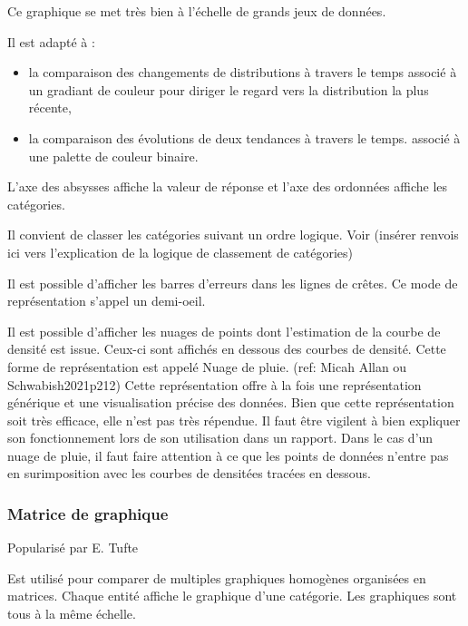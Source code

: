 \documentclass[a4paper,12pt]{article}
\begin{document}
\begin{multicols}{2}
Ce graphique se met très bien à l'échelle de grands jeux de données. \autocite{wilkeVisualizingManyDistributions2019}

Il est adapté à :
\begin{itemize}
\item la comparaison des changements de distributions à travers le temps \autocite{wilkeDirectoryVisualizations2019} associé à un gradiant de couleur pour diriger le regard vers la distribution la plus récente, \autocite{jonathanschwabishDistribution2021}
\item la comparaison des évolutions de deux tendances à travers le temps. \autocite{wilkeVisualizingManyDistributions2019} associé à une palette de couleur binaire.
\end{itemize}

L'axe des absysses affiche la valeur de réponse et l'axe des ordonnées affiche les catégories. \autocite{wilkeVisualizingManyDistributions2019}

Il convient de classer les catégories suivant un ordre logique. \autocite{jonathanschwabishDistribution2021} Voir (insérer renvois ici vers l'explication de la logique de classement de catégories)

Il est possible d'afficher les barres d'erreurs dans les lignes de crêtes. Ce mode de représentation s'appel un \og demi-oeil\fg{}. \autocite{wilkeVisualizingUncertainty2019}

Il est possible d'afficher les nuages de points dont l'estimation de la courbe de densité est issue. Ceux-ci sont affichés en dessous des courbes de densité. Cette forme de représentation est appelé \og Nuage de pluie\fg{}. (ref: Micah Allan ou Schwabish2021p212) Cette représentation offre à la fois une représentation générique et une visualisation précise des données. \autocite{jonathanschwabishDistribution2021} Bien que cette représentation soit très efficace, elle n'est pas très répendue. \autocite{jonathanschwabishDistribution2021} Il faut être vigilent à bien expliquer son fonctionnement lors de son utilisation dans un rapport. Dans le cas d'un nuage de pluie, il faut faire attention à ce que les points de données n'entre pas en surimposition avec les courbes de densitées tracées en dessous.
\subsubsection*{Matrice de graphique}
\label{sec:org642ccd6}
Popularisé par E. Tufte

Est utilisé pour comparer de multiples graphiques homogènes organisées en matrices. Chaque entité affiche le graphique d'une catégorie. Les graphiques sont tous à la même échelle. \autocite{sosulskiGraphics2019}


\end{multicols}
\end{document}
